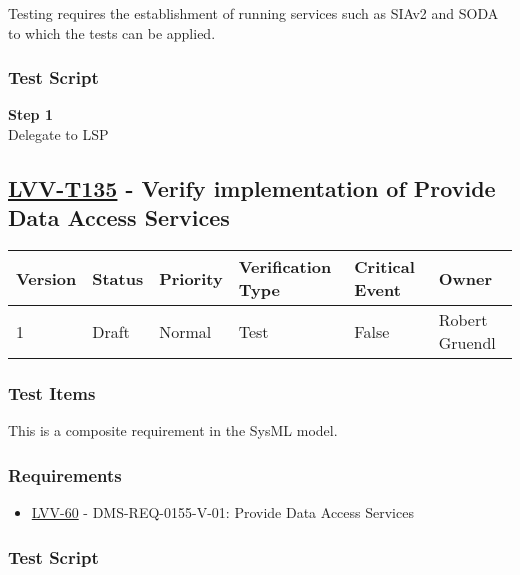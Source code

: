 Testing requires the establishment of running services such as SIAv2 and
SODA to which the tests can be applied.

\subsubsection{Test Script}\label{test-script-11}

\textbf{Step 1}\\
Delegate to LSP\\[2\baselineskip]

\hypertarget{lvv-t135---verify-implementation-of-provide-data-access-services}{\subsection{\texorpdfstring{\href{https://jira.lsstcorp.org/secure/Tests.jspa\#/testCase/LVV-T135}{LVV-T135}
- Verify implementation of Provide Data Access
Services}{LVV-T135 - Verify implementation of Provide Data Access Services}}\label{lvv-t135---verify-implementation-of-provide-data-access-services}}

\begin{longtable}[]{@{}llllll@{}}
\toprule
Version & Status & Priority & Verification Type & Critical Event &
Owner\tabularnewline
\midrule
\endhead
1 & Draft & Normal & Test & False & Robert Gruendl\tabularnewline
\bottomrule
\end{longtable}

\subsubsection{Test Items}\label{test-items-12}

This is a composite requirement in the SysML model.

\subsubsection{Requirements}\label{requirements-12}

\begin{itemize}
\tightlist
\item
  \href{https://jira.lsstcorp.org/browse/LVV-60}{LVV-60} -
  DMS-REQ-0155-V-01: Provide Data Access Services
\end{itemize}

\subsubsection{Test Script}\label{test-script-12}

